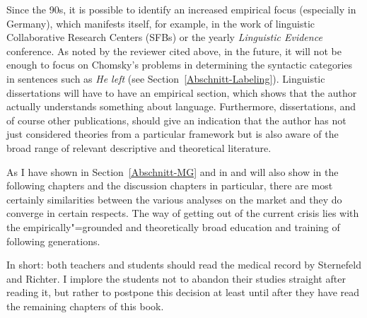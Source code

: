 {Since the 90s, it is possible to identify an increased empirical focus (especially in Germany),
which manifests itself, for example, in the work of linguistic Collaborative Research Centers (SFBs)
or the yearly \emph{Linguistic Evidence} conference. As noted by the reviewer cited above, in the
future, it will not be enough to focus on Chomsky's problems in determining the syntactic categories
in sentences such as \emph{He left} (see
Section~\ref{Abschnitt-Labeling}). Linguistic dissertations will have to have an empirical section, which shows that the author actually understands
something about language. Furthermore, dissertations, and of course other publications, should give an indication that the author has not just
considered theories from a particular framework but is also aware of the broad range of relevant descriptive and theoretical literature.
}

\begin{mdframed}[style=greyexercisenologo]
As I have shown in Section~\ref{Abschnitt-MG} and in  and will also show in
the following chapters and the discussion chapters in particular, there are most certainly similarities between the various analyses on the market 
and they do converge in certain respects. The way of getting out of the current crisis lies with the
empirically"=grounded and theoretically broad education and training of following generations.

In short: both teachers and students should read the medical record by Sternefeld and Richter. I implore the students not to abandon their studies straight
after reading it, but rather to postpone this decision at least until after they have read the remaining chapters of this book.
\end{mdframed}


